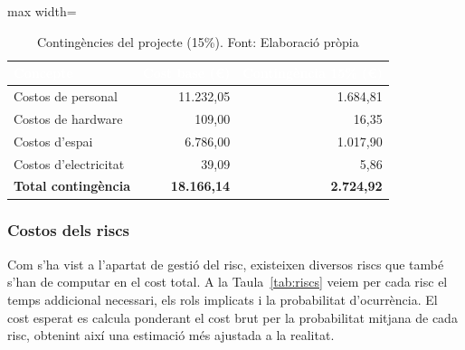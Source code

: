 \documentclass[11pt,a4paper]{report}
\begin{document}
\begin{table}[H]
    \centering
    \small
    \renewcommand{\arraystretch}{2}
    \begin{adjustbox}{max width=\textwidth}
    \begin{tabular}{|l|r|r|}
        \hline
        \rowcolor{oceanblue}
        \textcolor{white}{\textbf{Concepte}} &
        \textcolor{white}{\textbf{Cost base (€)}} &
        \textcolor{white}{\textbf{Contingència 15\% (€)}} \\
        \hline
        Costos de personal    & 11.232,05 & 1.684,81 \\
        \hline
        Costos de hardware    &    109,00 &    16,35 \\
        \hline
        Costos d'espai        &  6.786,00 & 1.017,90 \\
        \hline
        Costos d'electricitat &     39,09 &     5,86 \\
        \hline
        \rowcolor{gray!20}
        \textbf{Total contingència} & \textbf{18.166,14} & \textbf{2.724,92} \\
        \hline
    \end{tabular}
    \end{adjustbox}
    \caption[Contingències]{Contingències del projecte (15\%). Font: Elaboració pròpia}
    \label{tab:contingencies}
\end{table}

\subsubsection{Costos dels riscs}

Com s'ha vist a l'apartat de gestió del risc, existeixen diversos riscs que també 
s'han de computar en el cost total. A la Taula~\ref{tab:riscs} veiem per cada risc 
el temps addicional necessari, els rols implicats i la probabilitat d'ocurrència. 
El cost esperat es calcula ponderant el cost brut per la probabilitat mitjana de 
cada risc, obtenint així una estimació més ajustada a la realitat.
\end{document}
